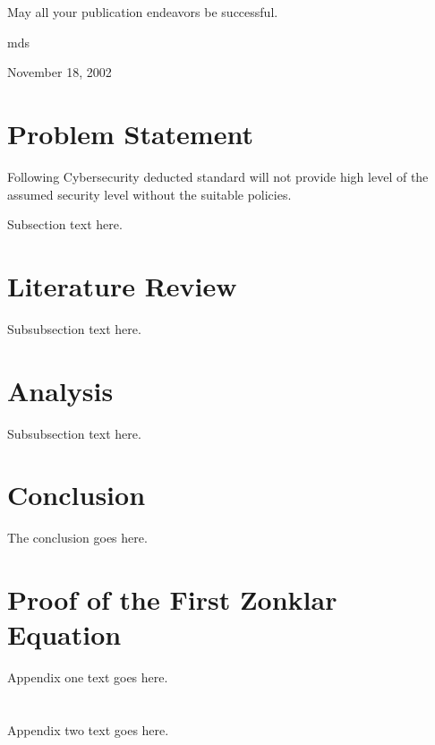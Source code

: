 \documentclass[journal]{IEEEtran}
\begin{document}
May all your publication endeavors be successful.

\hfill mds

\hfill November 18, 2002

\section{Problem Statement}
Following Cybersecurity deducted standard will not provide high level
of the assumed security level without the suitable policies.

Subsection text here.



\section{Literature Review}
Subsubsection text here.

\section{Analysis}
Subsubsection text here.


\section{Conclusion}
The conclusion goes here.

\appendices
\section{Proof of the First Zonklar Equation}
Appendix one text goes here.

\section{}
Appendix two text goes here.



\end{document}
